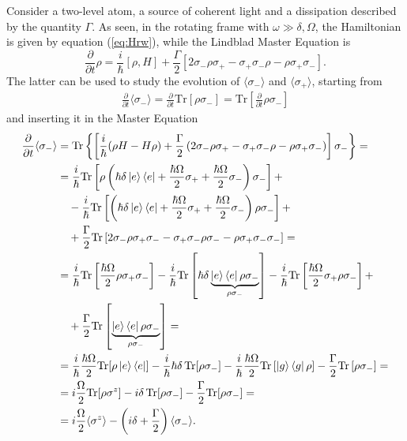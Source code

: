 Consider a two-level atom, a source of coherent light and a dissipation described by the quantity $\Gamma$. As seen, in the rotating frame with $\omega \gg \delta, \Omega$, the Hamiltonian is given by equation (\ref{eq:Hrw}), while the Lindblad Master Equation is
\begin{equation}
    \frac{\partial}{\partial t} {\rho} = \frac{i}{\hbar} [\rho,H] + \frac{\Gamma}{2} [2 \sigma_- \rho \sigma_+ - \sigma_+ \sigma_- \rho - \rho \sigma_+ \sigma_-]. 
\end{equation}
The latter can be used to study the evolution of $\langle \sigma_-\rangle$ and $\langle \sigma_+\rangle$, starting from 
\begin{align*}
    \frac{\partial}{\partial t} \langle \sigma_-\rangle = \frac{\partial}{\partial t} \text{Tr}[\rho \sigma_-] = \text{Tr}\left[\frac{\partial}{\partial t} {\rho} \sigma_-\right] 
\end{align*}
and inserting it in the Master Equation 
\begin{align*}
    \frac{\partial}{\partial t} \langle \sigma_-\rangle &= \text{Tr} \left\{ \left[ \frac{i}{\hbar} (\rho H - H \rho) + \frac{\Gamma}{2} \left( 2 \sigma_- \rho \sigma_+ - \sigma_+ \sigma_- \rho - \rho \sigma_+ \sigma_-\right)\right] \sigma_- \right\} = \\
    & = \frac{i}{\hbar} \text{Tr} \left[ \rho \left(\hbar \delta \ket{e}\bra{e} + \frac{\hbar \Omega}{2} \sigma_+ + \frac{\hbar \Omega}{2} \sigma_- \right) \sigma_- \right] + \\
    &~~~ -\frac{i}{\hbar} \text{Tr} \left[ \left(\hbar \delta \ket{e}\bra{e} + \frac{\hbar \Omega}{2} \sigma_+ + \frac{\hbar \Omega}{2} \sigma_- \right) \rho \sigma_- \right] + \\
    & ~~~ +\frac{\Gamma}{2} \text{Tr} \left[ 2 \sigma_- \rho \sigma_+ \sigma_- - \sigma_+ \sigma_- \rho  \sigma_- - \rho \sigma_+ \sigma_- \sigma_- \right] = \\
    &= \frac{i}{\hbar} \text{Tr}\left[ \frac{\hbar \Omega}{2} \rho \sigma_+ \sigma_-\right] - \frac{i}{\hbar} \text{Tr}\left[ \hbar \delta \underbrace{\ket{e}\bra{e} \rho \sigma_-}_{\rho \sigma_-} \right] - \frac{i}{\hbar} \text{Tr}\left[ \frac{\hbar \Omega}{2}  \sigma_+  \rho\sigma_-\right] + \\
    & ~~~ +\frac{\Gamma}{2} \text{Tr} \left[ \underbrace{\ket{e}\bra{e} \rho \sigma_-}_{\rho \sigma_-}\right] = \\
    & = \frac{i}{\hbar} \frac{\hbar \Omega}{2} \text{Tr}[\rho \ket{e}\bra{e}] - \frac{i}{\hbar} \hbar \delta \, \text{Tr}[\rho \sigma_-] - \frac{i}{\hbar} \frac{\hbar \Omega}{2} \text{Tr} \left[ \ket{g}\bra{g} \rho \right] - \frac{\Gamma}{2} \text{Tr} \left[ \rho \sigma_- \right] = \\
    &= i \frac{\Omega}{2} \text{Tr} [\rho \sigma^z] - i \delta \, \text{Tr} [\rho \sigma_-] - \frac{\Gamma}{2} \text{Tr} [\rho \sigma_-] = \\
    &= i\frac{\Omega}{2} \langle \sigma^z \rangle - \left(i \delta +\frac{\Gamma}{2} \right)  \langle \sigma_- \rangle .
\end{align*}
